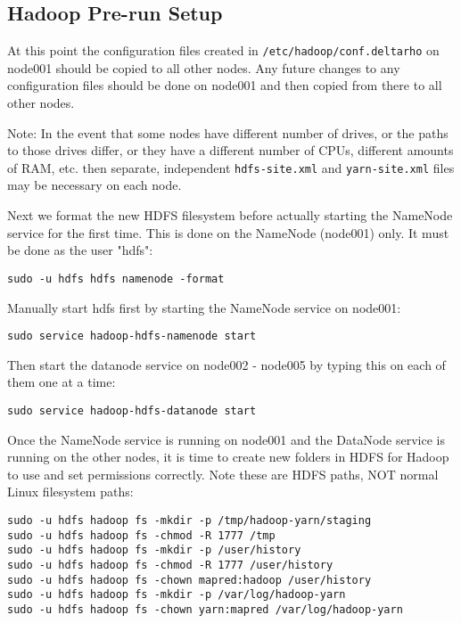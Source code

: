 \subsection{Hadoop Pre-run Setup}
At this point the configuration files created in
\verb|/etc/hadoop/conf.deltarho| on node001 should be copied to all
other nodes.  Any future changes to any configuration files should be
done on node001 and then copied from there to all other nodes.

Note: In the event that some nodes have different number of drives,
or the paths to those drives differ, or they have a different number
of CPUs, different amounts of RAM, etc. then separate, independent
\verb|hdfs-site.xml| and \verb|yarn-site.xml| files may be necessary on
each node.

Next we format the new HDFS filesystem before actually starting the
NameNode service for the first time.  This is done on the NameNode
(node001) only.  It must be done as the user "hdfs":

\begin{verbatim}
sudo -u hdfs hdfs namenode -format
\end{verbatim}

Manually start hdfs first by starting the NameNode service on node001:

\begin{verbatim}
sudo service hadoop-hdfs-namenode start
\end{verbatim}

Then start the datanode service on node002 - node005 by typing this on
each of them one at a time:

\begin{verbatim}
sudo service hadoop-hdfs-datanode start
\end{verbatim}

Once the NameNode service is running on node001 and the DataNode service
is running on the other nodes, it is time to create new folders in HDFS
for Hadoop to use and set permissions correctly.  Note these are HDFS
paths, NOT normal Linux filesystem paths:

\begin{verbatim}
sudo -u hdfs hadoop fs -mkdir -p /tmp/hadoop-yarn/staging
sudo -u hdfs hadoop fs -chmod -R 1777 /tmp
sudo -u hdfs hadoop fs -mkdir -p /user/history
sudo -u hdfs hadoop fs -chmod -R 1777 /user/history
sudo -u hdfs hadoop fs -chown mapred:hadoop /user/history
sudo -u hdfs hadoop fs -mkdir -p /var/log/hadoop-yarn
sudo -u hdfs hadoop fs -chown yarn:mapred /var/log/hadoop-yarn
\end{verbatim}

